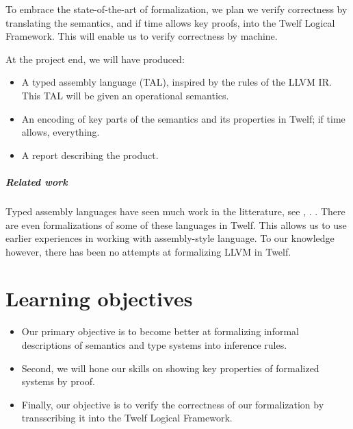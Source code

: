 \documentclass[a4paper, oneside, 10pt, draft]{memoir}
\begin{document}
To embrace the state-of-the-art of formalization, we plan we verify
correctness by translating the semantics, and if time allows key
proofs, into the Twelf Logical Framework. This will enable us to
verify correctness by machine.

At the project end, we will have produced:
\begin{itemize}
\item A typed assembly language (TAL), inspired by the rules of the LLVM
  IR. This TAL will be given an operational semantics.
\item An encoding of key parts of the semantics and its properties in
  Twelf; if time allows, everything.
\item A report describing the product.
\end{itemize}

\paragraph{Related work}

Typed assembly languages have seen much work in the litterature, see
\cite{crary:..}, \cite{morisett:...}. . There are even formalizations of some of these languages in
Twelf. This allows us to use earlier experiences in working with
assembly-style language. To our knowledge
however, there has been no attempts at formalizing LLVM in Twelf.

\chapter*{Learning objectives}

\begin{itemize}
\item Our primary objective is to become better at formalizing informal
  descriptions of semantics and type systems into inference rules.
\item Second, we will hone our skills on showing key properties of
  formalized systems by proof.
\item Finally, our objective is to verify the correctness of our
  formalization by transscribing it into the Twelf Logical Framework.
\end{itemize}


\end{document}
